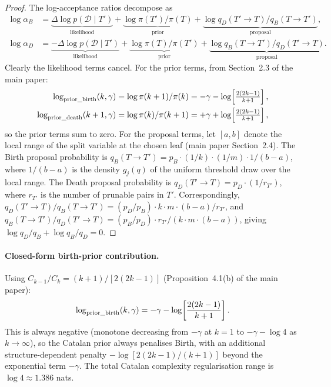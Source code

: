 \documentclass[ba,preprint]{imsart}
\theoremstyle{plain}
\theoremstyle{remark}
\begin{document}
\begin{proof}
The log-acceptance ratios decompose as
\begin{align*}
  \log\alpha_B &= \underbrace{\Delta\log p(\mathcal{D}\mid T')}_{\text{likelihood}}
    + \underbrace{\log\pi(T')/\pi(T)}_{\text{prior}}
    + \underbrace{\log q_D(T'\to T)/q_B(T\to T')}_{\text{proposal}}, \\
  \log\alpha_D &= \underbrace{-\Delta\log p(\mathcal{D}\mid T')}_{\text{likelihood}}
    + \underbrace{\log\pi(T)/\pi(T')}_{\text{prior}}
    + \underbrace{\log q_B(T\to T')/q_D(T'\to T)}_{\text{proposal}}.
\end{align*}
Clearly the likelihood terms cancel.
For the prior terms, from Section~2.3 of the main paper:
\begin{align*}
  \log_{\rm prior\_birth}(k,\gamma) &= \log\pi(k+1)/\pi(k)
    = -\gamma - \log\!\left[\tfrac{2(2k-1)}{k+1}\right], \\
  \log_{\rm prior\_death}(k+1,\gamma) &= \log\pi(k)/\pi(k+1)
    = +\gamma + \log\!\left[\tfrac{2(2k-1)}{k+1}\right],
\end{align*}
so the prior terms sum to zero.
For the proposal terms, let $[a,b]$ denote the local range of the
split variable at the chosen leaf (main paper Section~2.4).
The Birth proposal probability is
$q_B(T\to T') = p_B \cdot (1/k) \cdot (1/m) \cdot 1/(b-a)$,
where $1/(b-a)$ is the density $g_j(q)$ of the uniform threshold draw over
the local range.
The Death proposal probability is
$q_D(T'\to T) = p_D \cdot (1/r_{T'})$,
where $r_{T'}$ is the number of prunable pairs in $T'$.
Correspondingly,
$q_D(T'\to T)/q_B(T\to T') = (p_D/p_B) \cdot k \cdot m \cdot (b-a) / r_{T'}$,
and $q_B(T\to T')/q_D(T'\to T) = (p_B/p_D) \cdot r_{T'} / (k \cdot m \cdot (b-a))$,
giving $\log q_D/q_B + \log q_B/q_D = 0$.
\end{proof}

\paragraph{Closed-form birth-prior contribution.}
Using $C_{k-1}/C_k = (k+1)/[2(2k-1)]$ (Proposition~4.1(b) of the main paper):
\begin{equation}
  \log_{\rm prior\_birth}(k,\gamma) = -\gamma - \log\!\left[\frac{2(2k-1)}{k+1}\right].
  \label{eq:birth_prior}
\end{equation}
This is always negative (monotone decreasing from $-\gamma$ at $k=1$ to
$-\gamma - \log 4$ as $k\to\infty$), so the Catalan prior always penalises
Birth, with an additional structure-dependent penalty $-\log[2(2k-1)/(k+1)]$
beyond the exponential term $-\gamma$.
The total Catalan complexity regularisation range is $\log 4 \approx 1.386$ nats.
\end{document}
